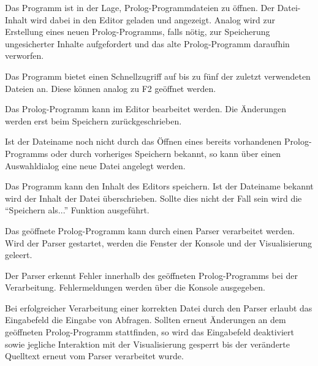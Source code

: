 \documentclass[parskip=full,11pt,twoside]{scrartcl}
\begin{document}
Das Programm ist in der Lage, Prolog-Programmdateien zu öffnen. Der Datei-Inhalt wird dabei in den Editor geladen und angezeigt. Analog wird zur Erstellung eines neuen Prolog-Programms, falls nötig, zur Speicherung ungesicherter Inhalte aufgefordert und das alte Prolog-Programm daraufhin verworfen.


Das Programm bietet einen Schnellzugriff auf bis zu fünf der zuletzt verwendeten Dateien an. Diese können analog zu F2 geöffnet werden.


Das Prolog-Programm kann im Editor bearbeitet werden. Die Änderungen werden erst beim Speichern zurückgeschrieben.


Ist der Dateiname noch nicht durch das Öffnen eines bereits vorhandenen Prolog-Programms oder durch vorheriges Speichern bekannt, so kann über einen Auswahldialog eine neue Datei angelegt werden.


Das Programm kann den Inhalt des Editors speichern. Ist der Dateiname bekannt wird der Inhalt der Datei überschrieben. Sollte dies nicht der Fall sein wird die \enquote{Speichern als...} Funktion ausgeführt.


Das geöffnete Prolog-Programm kann durch einen Parser verarbeitet werden. Wird der Parser gestartet, werden die Fenster der Konsole und der Visualisierung geleert.


Der Parser erkennt Fehler innerhalb des geöffneten Prolog-Programms bei der Verarbeitung. Fehlermeldungen werden über die Konsole ausgegeben.


Bei erfolgreicher Verarbeitung einer korrekten Datei durch den Parser erlaubt das Eingabefeld die Eingabe von Abfragen. Sollten erneut Änderungen an dem geöffneten Prolog-Programm stattfinden, so wird das Eingabefeld deaktiviert sowie jegliche Interaktion mit der Visualisierung gesperrt bis der veränderte Quelltext erneut vom Parser verarbeitet wurde.
\end{document}
